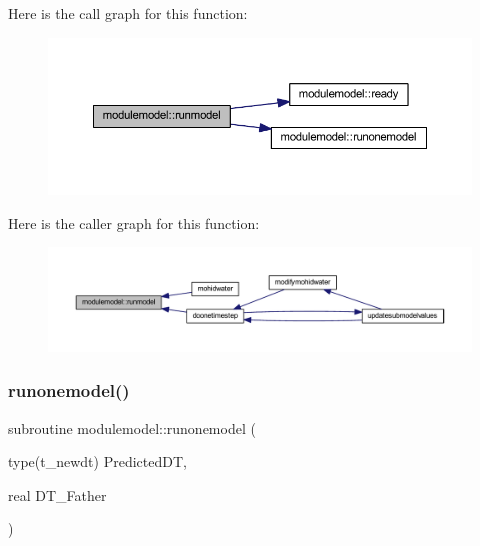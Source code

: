 Here is the call graph for this function\+:\nopagebreak
\begin{figure}[H]
\begin{center}
\leavevmode
\includegraphics[width=350pt]{namespacemodulemodel_a16a07d5b28a4877790acec46aed111b6_cgraph}
\end{center}
\end{figure}
Here is the caller graph for this function\+:\nopagebreak
\begin{figure}[H]
\begin{center}
\leavevmode
\includegraphics[width=350pt]{namespacemodulemodel_a16a07d5b28a4877790acec46aed111b6_icgraph}
\end{center}
\end{figure}
\mbox{\label{namespacemodulemodel_ab22d85061a595a03c83c11766cba5587}} 
\subsubsection{\texorpdfstring{runonemodel()}{runonemodel()}}
{\footnotesize\ttfamily subroutine modulemodel\+::runonemodel (\begin{DoxyParamCaption}\item[{type(t\+\_\+newdt)}]{Predicted\+DT,  }\item[{real}]{D\+T\+\_\+\+Father }\end{DoxyParamCaption})\hspace{0.3cm}{\ttfamily [private]}}

